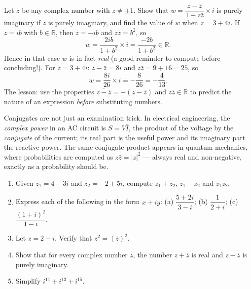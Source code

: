 \documentclass[11pt]{article}
\begin{document}
\begin{exoresolu}
Let $z$ be any complex number with $z\neq\pm 1$. Show that $w=\dfrac{z-\bar{z}}{1+z\bar{z}}\times i$ is purely imaginary if $z$ is purely imaginary, and find the value of $w$ when $z=3+4i$.
\tcblower
If $z=ib$ with $b\in\mathbb{R}$, then $\bar{z}=-ib$ and $z\bar{z}=b^{2}$, so
\[
w=\frac{2ib}{1+b^{2}}\times i=\frac{-2b}{1+b^{2}}\in\mathbb{R}.
\]
Hence in that case $w$ is in fact \emph{real} (a good reminder to compute before concluding!). For $z=3+4i$: $z-\bar{z}=8i$ and $z\bar{z}=9+16=25$, so
\[
w=\frac{8i}{26}\times i=-\frac{8}{26}=-\frac{4}{13}.
\]
The lesson: use the properties $\overline{z-\bar{z}}=-(z-\bar{z})$ and $z\bar{z}\in\mathbb{R}$ to predict the nature of an expression \emph{before} substituting numbers.
\end{exoresolu}

\begin{savaistu}
Conjugates are not just an examination trick. In electrical engineering, the \emph{complex power} in an AC circuit is $S=V\bar{I}$, the product of the voltage by the \emph{conjugate} of the current; its real part is the useful power and its imaginary part the reactive power. The same conjugate product appears in quantum mechanics, where probabilities are computed as $z\bar{z}=|z|^{2}$ — always real and non-negative, exactly as a probability should be.
\end{savaistu}

\begin{exercice}[Practice]
\begin{enumerate}
\item Given $z_{1}=4-3i$ and $z_{2}=-2+5i$, compute $z_{1}+z_{2}$, $z_{1}-z_{2}$ and $z_{1}z_{2}$.
\item Express each of the following in the form $x+iy$: (a) $\dfrac{5+2i}{3-i}$; (b) $\dfrac{1}{2+i}$; (c) $\dfrac{(1+i)^{2}}{1-i}$.
\item Let $z=2-i$. Verify that $\overline{z^{2}}=(\bar{z})^{2}$.
\item Show that for every complex number $z$, the number $z+\bar{z}$ is real and $z-\bar{z}$ is purely imaginary.
\item Simplify $i^{11}+i^{13}+i^{15}$.
\end{enumerate}
\end{exercice}
\end{document}
